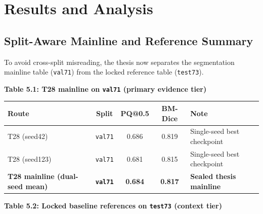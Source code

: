 \section{Results and Analysis}\label{results-and-analysis}

\subsection{Split-Aware Mainline and Reference Summary}\label{split-aware-mainline-and-reference-summary}

To avoid cross-split misreading, the thesis now separates the segmentation mainline table (\texttt{val71}) from the locked reference table (\texttt{test73}).

\textbf{Table 5.1: T28 mainline on \texttt{val71} (primary evidence tier)}

{%
\begin{longtable}[]{@{}lcccl@{}}
\toprule\noalign{}
Route & Split & PQ@0.5 & BM-Dice & Note \\
\midrule\noalign{}
\endhead
\bottomrule\noalign{}
\endlastfoot
T28 (seed42) & \texttt{val71} & 0.686 & 0.819 & Single-seed best checkpoint \\
T28 (seed123) & \texttt{val71} & 0.681 & 0.815 & Single-seed best checkpoint \\
\textbf{T28 mainline (dual-seed mean)} & \textbf{\texttt{val71}} & \textbf{0.684} & \textbf{0.817} & \textbf{Sealed thesis mainline} \\
\end{longtable}
}

\textbf{Table 5.2: Locked baseline references on \texttt{test73} (context tier)}

